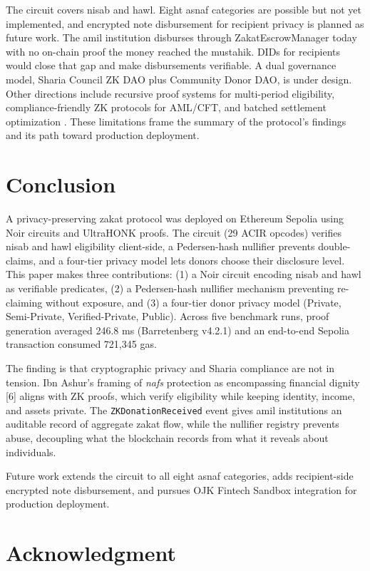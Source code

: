 \documentclass[conference]{IEEEtran}
\begin{document}
The circuit covers nisab and hawl. Eight asnaf categories are possible but not yet implemented, and encrypted note disbursement for recipient privacy is planned as future work. The amil institution disburses through ZakatEscrowManager today with no on-chain proof the money reached the mustahik. DIDs for recipients would close that gap and make disbursements verifiable. A dual governance model, Sharia Council ZK DAO plus Community Donor DAO, is under design. Other directions include recursive proof systems for multi-period eligibility, compliance-friendly ZK protocols for AML/CFT, and batched settlement optimization \cite{b_zkp_circuits,b_zkfi,b_halal_crypto}. These limitations frame the summary of the protocol's findings and its path toward production deployment.

\section{Conclusion}

A privacy-preserving zakat protocol was deployed on Ethereum Sepolia using Noir circuits and UltraHONK proofs. The circuit (29 ACIR opcodes) verifies nisab and hawl eligibility client-side, a Pedersen-hash nullifier prevents double-claims, and a four-tier privacy model lets donors choose their disclosure level. This paper makes three contributions: (1) a Noir circuit encoding nisab and hawl as verifiable predicates, (2) a Pedersen-hash nullifier mechanism preventing re-claiming without exposure, and (3) a four-tier donor privacy model (Private, Semi-Private, Verified-Private, Public). Across five benchmark runs, proof generation averaged 246.8 ms (Barretenberg v4.2.1) and an end-to-end Sepolia transaction consumed 721,345 gas.

The finding is that cryptographic privacy and Sharia compliance are not in tension. Ibn Ashur's framing of \textit{nafs} protection as encompassing financial dignity [6] aligns with ZK proofs, which verify eligibility while keeping identity, income, and assets private. The \texttt{ZKDonationReceived} event gives amil institutions an auditable record of aggregate zakat flow, while the nullifier registry prevents abuse, decoupling what the blockchain records from what it reveals about individuals.

Future work extends the circuit to all eight asnaf categories, adds recipient-side encrypted note disbursement, and pursues OJK Fintech Sandbox integration for production deployment.

\section*{Acknowledgment}
\end{document}
